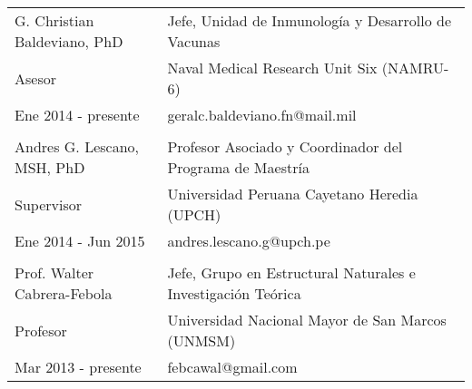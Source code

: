 \documentclass[margin,line]{res}
\begin{document}
\begin{resume}
		\begin{tabular}{ l l }
			G. Christian Baldeviano, PhD & Jefe, Unidad de Inmunología y Desarrollo de Vacunas\\
			Asesor & Naval Medical Research Unit Six (NAMRU-6)\\
			Ene 2014 - presente & geralc.baldeviano.fn@mail.mil\\
			&\\
			Andres G. Lescano, MSH, PhD & Profesor Asociado y Coordinador del Programa de Maestría\\
			Supervisor & Universidad Peruana Cayetano Heredia (UPCH)\\
			Ene 2014 - Jun 2015 & andres.lescano.g@upch.pe\\
			&\\
			Prof. Walter Cabrera-Febola & Jefe, Grupo en Estructural Naturales e Investigación Teórica\\
			Profesor & Universidad Nacional Mayor de San Marcos (UNMSM)\\
			Mar 2013 - presente & febcawal@gmail.com\\	
		\end{tabular}
		
		
		
		
		
		
		
		
		
		
		
		
		
		
		
		

\end{resume}
\end{document}
